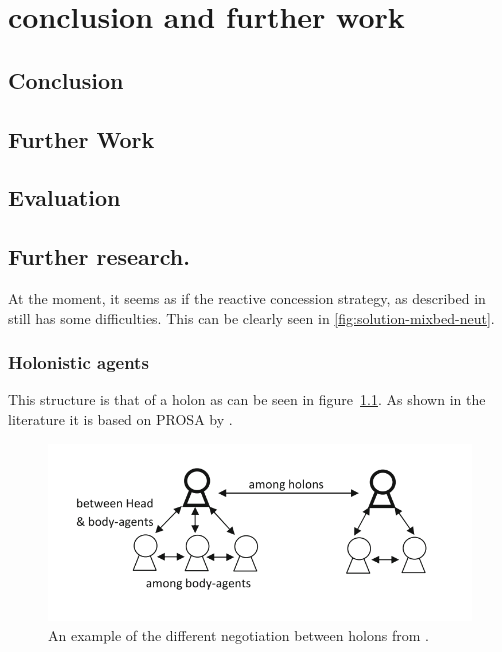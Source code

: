 \chapter{conclusion and further work}
\section{Conclusion}
\section{Further Work}
\section{Evaluation}


\section{Further research.}
At the moment, it seems as if the reactive concession strategy, as described in \citet{zheng2015automated} still has some difficulties. This can be clearly seen in \cref{fig:solution-mixbed-neut}. 
%




\subsection{Holonistic agents}

This structure is that of a holon as can be seen in figure~\cref{fig:holonexample}. As shown in the literature it is based on PROSA by \citet{van1998reference}.
\begin{figure}
	\centering
	\includegraphics[width=0.7\linewidth]{img/holon_example}
	\caption{An example of the different negotiation between holons from \citet{beheshti2016negotiations}.}
	\label{fig:holonexample}
\end{figure}

